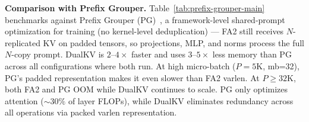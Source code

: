 \documentclass{article}
\begin{document}
\textbf{Comparison with Prefix Grouper.}
Table~\ref{tab:prefix-grouper-main} benchmarks against Prefix Grouper (PG)~\citep{liu2025prefixgrouper}, a framework-level shared-prompt optimization for training (no kernel-level deduplication) --- FA2 still receives $N$-replicated KV on padded tensors, so projections, MLP, and norms process the full $N$-copy prompt. DualKV is $2$--$4\times$ faster and uses $3$--$5\times$ less memory than PG across all configurations where both run. At high micro-batch ($P{=}5\text{K}$, mb=32), PG's padded representation makes it even slower than FA2 varlen. At $P{\geq}32\text{K}$, both FA2 and PG OOM while DualKV continues to scale. PG only optimizes attention (${\sim}30\%$ of layer FLOPs), while DualKV eliminates redundancy across all operations via packed varlen representation.
\iffalse
\end{document}
